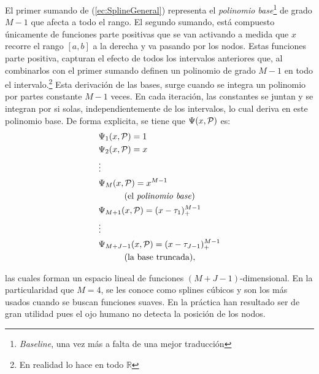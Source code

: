 \documentclass[../Main/Main.tex]{subfiles}
\begin{document}
El primer sumando de (\ref{ec:SplineGeneral}) representa el \textit{polinomio base}\footnote{\textit{Baseline}, una vez más a falta de una mejor traducción} de grado $M-1$ %
que afecta a todo el rango. El segundo sumando, está compuesto únicamente de funciones parte positivas que se van activando a medida que $x$ recorre el rango $[a,b]$ a la derecha y va pasando por los nodos. Estas funciones parte positiva, capturan el efecto de todos los intervalos anteriores que, al combinarlos con el primer sumando definen un polinomio de grado $M-1$ en todo el intervalo.\footnote{En realidad lo hace en todo $\mathbb{R}$} Esta derivación de las bases, surge cuando se integra un polinomio por partes constante $M-1$ veces. En cada iteración, las constantes se juntan y se integran por si solas, independientemente de los intervalos, lo cual deriva en este polinomio base. De forma explicita, se tiene que $\Psi(x,\P)$ es:
\begin{align*}
	&\Psi_1(x,\P) = 1 \\ 
	&\Psi_2(x,\P) = x \\ 
	& \vdots \\
	&\Psi_M(x,\P) = x^{M-1}\\
	& \quad \quad \quad \text{(el \textit{polinomio base})}\\				
	&\Psi_{M + 1}(x,\P) = (x - \t_1)_+^{M-1} \\				
	& \vdots \\
	&\Psi_{M + J - 1}(x,\P) = (x - \t_{J - 1})_+^{M-1} \\
	& \quad \quad \quad \text{(la base truncada)},		 
\end{align*}

las cuales forman un espacio lineal de funciones $(M + J - 1)$-dimensional. En la particularidad que $M = 4$, se les conoce como splines cúbicos y son los más usados cuando se buscan funciones suaves. En la práctica han resultado ser de gran utilidad pues el ojo humano no detecta la posición de los nodos.
\end{document}
